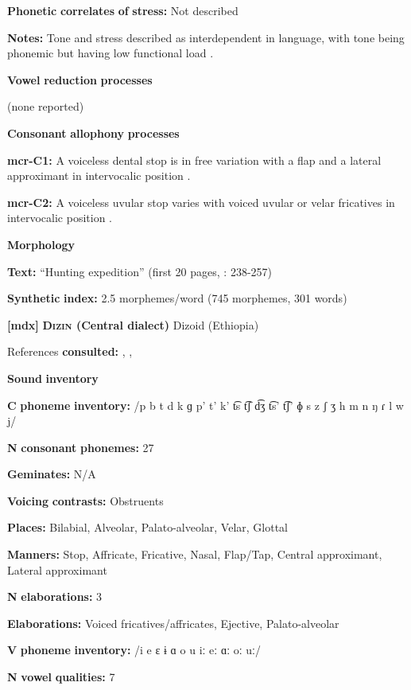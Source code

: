 \textbf{Phonetic} \textbf{correlates} \textbf{of} \textbf{stress:} Not described

\textbf{Notes:} Tone and stress described as interdependent in language, with tone being phonemic but having low functional load \citep[226]{Whitehead2004}. 

\textbf{Vowel} \textbf{reduction} \textbf{processes}

(none reported)

\textbf{Consonant} \textbf{allophony} \textbf{processes}

\textbf{mcr-C1:} A voiceless dental stop is in free variation with a flap and a lateral approximant in intervocalic position \citep[9]{Whitehead2004}.

\textbf{mcr-C2:} A voiceless uvular stop varies with voiced uvular or velar fricatives in intervocalic position \citep[9]{Whitehead2004}.

\textbf{Morphology}

\textbf{Text:} “Hunting expedition” (first 20 pages, \citealt{Whitehead2004}: 238-257)

\textbf{Synthetic} \textbf{index:} 2.5 morphemes/word (745 morphemes, 301 words)

\textbf{[mdx]}   \textbf{\textsc{Dizin} \textbf{(Central} \textbf{dialect)}}  Dizoid (Ethiopia)

References \textbf{consulted:} \citet{Allan1976}, \citet{Beachy2005}, \citet{Breeze1988}

\textbf{Sound} \textbf{inventory}

\textbf{C} \textbf{phoneme} \textbf{inventory:} /p b t d k ɡ p’ t’ k’ t͡s t͡ʃ d͡ʒ t͡s’ t͡ʃ’ ɸ s z ʃ ʒ h m n ŋ ɾ l w j/

\textbf{N} \textbf{consonant} \textbf{phonemes:} 27

\textbf{Geminates:} N/A

\textbf{Voicing} \textbf{contrasts:} Obstruents

\textbf{Places:} Bilabial, Alveolar, Palato-alveolar, Velar, Glottal

\textbf{Manners:} Stop, Affricate, Fricative, Nasal, Flap/Tap, Central approximant, Lateral approximant

\textbf{N} \textbf{elaborations:} 3

\textbf{Elaborations:} Voiced fricatives/affricates, Ejective, Palato-alveolar

\textbf{V} \textbf{phoneme} \textbf{inventory:} /i e ɛ ɨ ɑ o u iː eː ɑː oː uː/

\textbf{N} \textbf{vowel} \textbf{qualities:} 7

